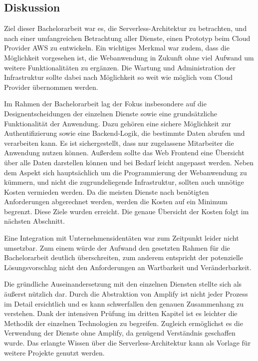 \subsection{Diskussion}

Ziel dieser Bachelorarbeit war es, die Serverless-Architektur zu betrachten, und nach einer umfangreichen Betrachtung aller Dienste, einen Prototyp beim Cloud Provider AWS zu entwickeln.
Ein wichtiges Merkmal war zudem, dass die Möglichkeit vorgesehen ist, die Webanwendung in Zukunft ohne viel Aufwand um weitere Funktionalitäten zu ergänzen.
Die Wartung und Administration der Infrastruktur sollte dabei nach Möglichkeit so weit wie möglich vom Cloud Provider übernommen werden.

Im Rahmen der Bachelorarbeit lag der Fokus insbesondere auf die Designentscheidungen der einzelnen Dienste sowie eine grundsätzliche Funktionalität der Anwendung.
Dazu gehören eine sichere Möglichkeit zur Authentifizierung sowie eine Backend-Logik, die bestimmte Daten abrufen und verarbeiten kann.
Es ist sichergestellt, dass nur zugelassene Mitarbeiter die Anwendung nutzen können.
Außerdem sollte das Web Frontend eine Übersicht über alle Daten darstellen können und bei Bedarf leicht angepasst werden.
Neben dem Aspekt sich hauptsächlich um die Programmierung der Webanwendung zu kümmern, und nicht die zugrundeliegende Infrastruktur, sollten auch unnötige Kosten vermieden werden.
Da die meisten Dienste nach benötigten Anforderungen abgerechnet werden, werden die Kosten auf ein Minimum begrenzt.
Diese Ziele wurden erreicht. Die genaue Übersicht der Kosten folgt im nächsten Abschnitt.

Eine Integration mit Unternehmensidentäten war zum Zeitpunkt leider nicht umsetzbar.
Zum einem würde der Aufwand den gesetzten Rahmen für die Bachelorarbeit deutlich überschreiten, zum anderem entspricht der potenzielle Lösungsvorschlag nicht den Anforderungen an Wartbarkeit und Veränderbarkeit.

Die gründliche Auseinandersetzung mit den einzelnen Diensten stellte sich als äußerst nützlich dar.
Durch die Abstraktion von Amplify ist nicht jeder Prozess im Detail ersichtlich und es kann schwerfallen den genauen Zusammenhang zu verstehen.
Dank der intensiven Prüfung im dritten Kapitel ist es leichter die Methodik der einzelnen Technologien zu begreifen.
Zugleich ermöglichst es die Verwendung der Dienste ohne Amplify, da genügend Verständnis geschaffen wurde.
Das erlangte Wissen über die Serverless-Architektur kann als Vorlage für weitere Projekte genutzt werden.

